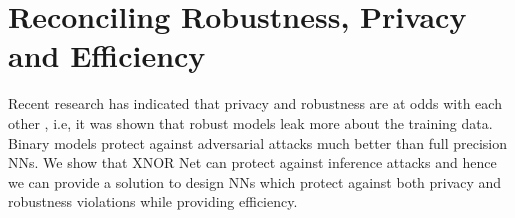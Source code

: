 \section{Reconciling Robustness, Privacy and Efficiency}\label{reconcile}


Recent research has indicated that privacy and robustness are at odds with each other \cite{10.1145/3319535.3354211}, i.e, it was shown that robust models leak more about the training data.
Binary models protect against adversarial attacks much better than full precision NNs. \cite{lin2018defensive}\cite{8723317}
We show that XNOR Net can protect against inference attacks and hence we can provide a solution to design NNs which protect against both privacy and robustness violations while providing efficiency.
